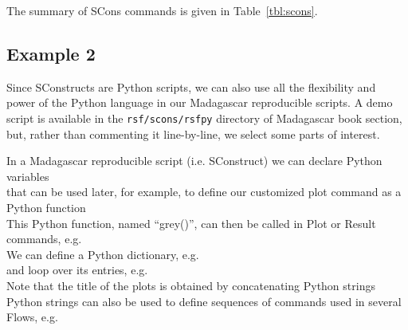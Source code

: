 The summary of SCons commands is given in Table~\ref{tbl:scons}.

\subsection{Example 2}

Since SConstructs are Python scripts, we can also use all the
flexibility and power of the Python language in our
Madagascar reproducible scripts. A demo script is available in the
\texttt{rsf/scons/rsfpy} directory of Madagascar book section, but,
rather than commenting it line-by-line, we select some parts of
interest.

In a Madagascar reproducible script (i.e. SConstruct) we can declare
Python variables\\



\noindent that can be used later, for example, to define our customized plot
command as a Python function\\



This Python function, named ``grey()'', can then be called in Plot or Result
commands, e.g.\\



We can define a Python dictionary, e.g.\\



\noindent and loop over its entries, e.g.\\



Note that the title of the plots is obtained by concatenating Python
strings\\



Python strings can also be used to define sequences of commands used
in several Flows, e.g.\\



